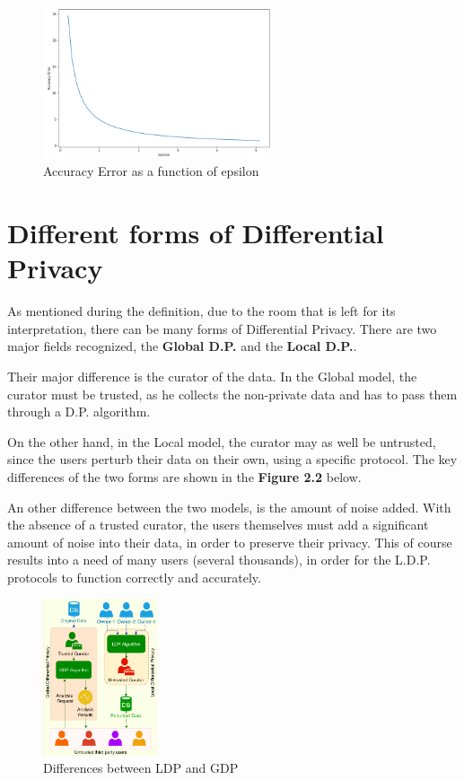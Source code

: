 \begin{figure}[!htb]\centering
      \includegraphics[width=0.6\textwidth]{images/epsilon_intro_graph.png}
  \caption{Accuracy Error as a function of epsilon}
\end{figure}

\section{Different forms of Differential Privacy}

As mentioned during the definition, due to the room that is left for its interpretation, there can be many forms of Differential Privacy. There are two major fields recognized, the \textbf{Global D.P.} and the \textbf{Local D.P.}.

Their major difference is the curator of the data. In the Global model, the curator must be trusted, as he collects the non-private data and has to pass them through a D.P. algorithm.

On the other hand, in the Local model, the curator may as well be untrusted, since the users perturb their data on their own, using a specific protocol. The key differences of the two forms are shown in the \textbf{Figure 2.2} below.

An other difference between the two models, is the amount of noise added. With the absence of a trusted curator, the users themselves must add a significant amount of noise into their data, in order to preserve their privacy. This of course results into a need of many users (several thousands), in order for the L.D.P. protocols to function correctly and accurately.


\begin{figure}[!htb]\centering
      \includegraphics[width=0.3\textwidth]{images/local_vs_global.png}
  \caption{Differences between LDP and GDP}
\end{figure}

